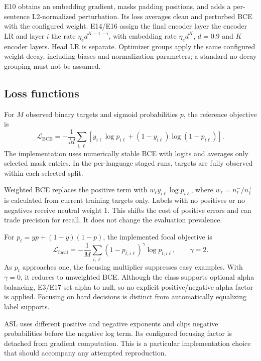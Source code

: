 E10 obtains an embedding gradient, masks padding positions, and adds a per-sentence L2-normalized perturbation. Its loss averages clean and perturbed BCE with the configured weight. E14/E16 assign the final encoder layer the encoder LR and layer $i$ the rate $\eta_e d^{K-1-i}$, with embedding rate $\eta_e d^K$, $d=0.9$ and $K$ encoder layers. Head LR is separate. Optimizer groups apply the same configured weight decay, including biases and normalization parameters; a standard no-decay grouping must not be assumed.

\subsection{Loss functions}\label{sec:losses}
For $M$ observed binary targets and sigmoid probabilities $p$, the reference objective is
\begin{equation}
\mathcal L_{\mathrm{BCE}}=-\frac1M\sum_{i,\ell}\left[y_{i\ell}\log p_{i\ell}+(1-y_{i\ell})\log(1-p_{i\ell})\right].
\end{equation}
The implementation uses numerically stable BCE with logits and averages only selected mask entries. In the per-language staged runs, targets are fully observed within each selected split.

Weighted BCE replaces the positive term with $w_\ell y_{i\ell}\log p_{i\ell}$, where $w_\ell=n^-_\ell/n^+_\ell$ is calculated from current training targets only. Labels with no positives or no negatives receive neutral weight 1. This shifts the cost of positive errors and can trade precision for recall. It does not change the evaluation prevalence.

For $p_t=yp+(1-y)(1-p)$, the implemented focal objective is
\begin{equation}
\mathcal L_{\mathrm{focal}}=-\frac1M\sum_{i,\ell}(1-p_{t,i\ell})^\gamma\log p_{t,i\ell},\qquad\gamma=2.
\end{equation}
As $p_t$ approaches one, the focusing multiplier suppresses easy examples. With $\gamma=0$, it reduces to unweighted BCE. Although the class supports optional alpha balancing, E3/E17 set alpha to null, so no explicit positive/negative alpha factor is applied. Focusing on hard decisions is distinct from automatically equalizing label supports.

ASL uses different positive and negative exponents and clips negative probabilities before the negative log term. Its configured focusing factor is detached from gradient computation. This is a particular implementation choice that should accompany any attempted reproduction.


